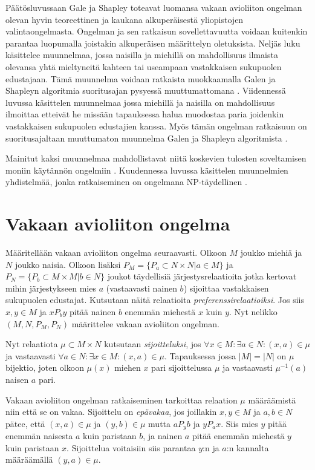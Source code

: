 \documentclass[gradu, twoside]{tktltiki}
\begin{document}
Päätösluvussaan Gale ja Shapley toteavat luomansa vakaan avioliiton
ongelman olevan hyvin teoreettinen ja kaukana alkuperäisestä
yliopistojen valintaongelmasta. Ongelman ja sen ratkaisun
sovellettavuutta voidaan kuitenkin parantaa luopumalla joistakin
alkuperäisen määrittelyn oletuksista. Neljäs luku käsittelee
muunnelmaa, jossa naisilla ja miehillä on mahdollisuus ilmaista
olevansa yhtä mieltyneitä kahteen tai useampaan vastakkaisen
sukupuolen edustajaan. Tämä muunnelma voidaan ratkaista muokkaamalla
Galen ja Shapleyn algoritmia suoritusajan pysyessä muuttumattomana
\cite{manlove02}. Viidennessä luvussa käsittelen muunnelmaa jossa
miehillä ja naisilla on mahdollisuus ilmoittaa etteivät he missään
tapauksessa halua muodostaa paria joidenkin vastakkaisen sukupuolen
edustajien kanssa. Myös tämän ongelman ratkaisuun on suoritusajaltaan
muuttumaton muunnelma Galen ja Shapleyn algoritmista
\cite{gusfield89}.

Mainitut kaksi muunnelmaa mahdollistavat niitä koskevien tulosten
soveltamisen moniin käytännön ongelmiin \cite{manlove02}. Kuudennessa
luvussa käsittelen muunnelmien yhdistelmää, jonka ratkaiseminen on
ongelmana NP-täydellinen \cite{manlove02}.

\section{Vakaan avioliiton ongelma}

Määritellään vakaan avioliiton ongelma seuraavasti. Olkoon $M$ joukko
miehiä ja $N$ joukko naisia. Olkoon lisäksi $P_M = \{P_a \subset N
\times N | a \in M\}$ ja $P_N = \{P_b \subset M \times M | b \in N\}$
joukot täydellisiä järjestysrelaatioita jotka kertovat mihin
järjestykseen mies $a$ (vastaavasti nainen $b$) sijoittaa vastakkaisen
sukupuolen edustajat. Kutsutaan näitä relaatioita
\emph{preferenssirelaatioiksi}. Jos siis $x,y \in M$ ja $xP_by$ pitää
nainen $b$ enemmän miehestä $x$ kuin $y$. Nyt nelikko $(M, N, P_M,
P_N)$ määrittelee vakaan avioliiton ongelman.

Nyt relaatiota $\mu \subset M \times N$ kutsutaan \emph{sijoitteluksi},
jos $\forall x \in M: \exists a \in N: (x, a) \in \mu$ ja vastaavasti
$\forall a \in N: \exists x \in M: (x, a) \in \mu$. Tapauksessa jossa
$|M| = |N|$ on $\mu$ bijektio, joten olkoon $\mu(x)$ miehen $x$ pari
sijoittelussa $\mu$ ja vastaavasti $\mu^{-1}(a)$ naisen $a$ pari.

Vakaan avioliiton ongelman ratkaiseminen tarkoittaa relaation $\mu$
määräämistä niin että se on vakaa. Sijoittelu on \emph{epävakaa}, jos
joillakin $x, y \in M$ ja $a, b \in N$ pätee, että $(x, a) \in \mu$ ja
$(y, b) \in \mu$ mutta $aP_yb$ ja $yP_ax$. Siis mies $y$ pitää enemmän
naisesta $a$ kuin paristaan $b$, ja nainen $a$ pitää enemmän miehestä
$y$ kuin paristaan $x$. Sijoittelua voitaisiin siis parantaa $y$:n ja
$a$:n kannalta määräämällä $(y, a) \in \mu$.
\end{document}
